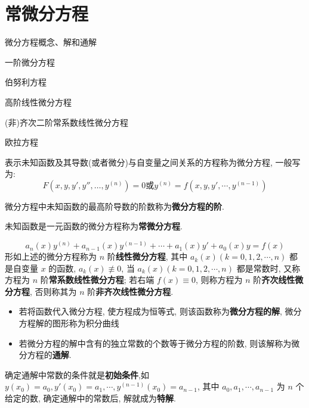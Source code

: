 \chapter{常微分方程}
\begin{introduction}
	\item 微分方程概念、解和通解
	\item 一阶微分方程
	\item 伯努利方程
	\item 高阶线性微分方程
	\item (非)齐次二阶常系数线性微分方程
	\item 欧拉方程
\end{introduction}
\begin{definition}[微分方程及其阶]
	表示未知函数及其导数(或者微分)与自变量之间关系的方程称为微分方程, 一般写为:
	$$F(x,y,y',y'',\dots,y^{(n)})=0\text{或} y^{(n)} = f(x,y,y',\cdots,y^{(n-1)})$$
	
	微分方程中未知函数的最高阶导数的阶数称为\textbf{微分方程的阶}.
\end{definition}

\begin{definition}[常微分方程]
	未知函数是一元函数的微分方程称为\textbf{常微分方程}.
\end{definition}

\begin{definition}[线性微分方程]
	$$a_{n}(x)y^{(n)} + a_{n-1}(x)y^{(n-1)} + \cdots + a_{1}(x)y' + a_{0}(x) y = f(x)$$
	形如上述的微分方程称为 $n$ 阶\textbf{线性微分方程}, 其中 $a_{k}(x)(k=0,1,2,\cdots,n)$ 都是自变量 $x$ 的函数, $a_{k}(x)\not\equiv 0$, 当 $a_{k}(x)(k=0,1,2,\cdots,n)$ 都是常数时,
	又称方程为 $n$ 阶\textbf{常系数线性微分方程}; 若右端 $f(x)\equiv 0$, 则称方程为 $n$ 阶\textbf{齐次线性微分方程}, 否则称其为 $n$ 阶\textbf{非齐次线性微分方程}.
\end{definition}
\begin{definition}[微分方程的解和通解]
	\begin{itemize}
		\item 若将函数代入微分方程, 使方程成为恒等式, 则该函数称为\textbf{微分方程的解}, 微分方程解的图形称为积分曲线
		\item 若微分方程的解中含有的独立常数的个数等于微分方程的阶数, 则该解称为微分方程的\textbf{通解}.
	\end{itemize}
\end{definition}
\begin{definition}[初始条件和特解]
	确定通解中常数的条件就是\textbf{初始条件},如 $y(x_{0})=a_{0},y'(x_{0})=a_{1},\cdots,y^{(n-1)}(x_{0})=a_{n-1}$,
	其中 $a_{0},a_{1},\cdots,a_{n-1}$ 为 $n$ 个给定的数, 确定通解中的常数后, 解就成为\textbf{特解}.
\end{definition}

